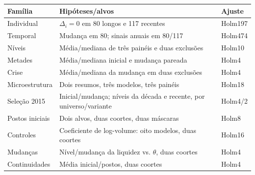 \begin{tabular}{p{}p{}p{}}
\toprule
Família & Hipóteses/alvos & Ajuste\\\midrule
Individual & $\Delta_i=0$ em 80 longos e 117 recentes & Holm197\\
Temporal & Mudança em 80; sinais anuais em 80/117 & Holm474\\
Níveis & Média/mediana de três painéis e duas exclusões & Holm10\\
Metades & Média/mediana inicial e mudança pareada & Holm4\\
Crise & Média/mediana da mudança em duas exclusões & Holm4\\
Microestrutura & Dois resumos, três modelos, três painéis & Holm18\\
Seleção 2015 & Inicial/mudança; níveis da década e recente, por universo/variante & Holm4/2\\
Postos iniciais & Dois alvos, duas coortes, duas máscaras & Holm8\\
Controles & Coeficiente de log-volume: oito modelos, duas coortes & Holm16\\
Mudanças & Nível/mudança da liquidez vs. $\theta$, duas coortes & Holm4\\
Continuidades & Média inicial/postos, duas coortes & Holm4\\\bottomrule
\end{tabular}
